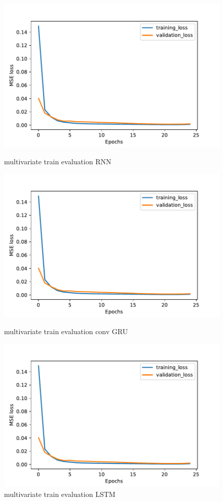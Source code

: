 \documentclass
[twocolumn,
secnumarabic,
nobibnotes,
aps,
prl,
reprint,
groupedaddress,
amsmath,
amssymb,
]{revtex4-2}
\begin{document}
\begin{figure}
  \includegraphics[width=\columnwidth]{figures/multivariate_train_evaluation_RNN.pdf}
  \caption{\label{fig:multivariate_train_evaluation_RNN} multivariate train evaluation RNN}
  \includegraphics[width=\columnwidth]{figures/multivariate_train_evaluation_RNN.pdf}
  \caption{\label{fig:multivariate_train_evaluation_ConvGRU} multivariate train evaluation conv GRU}
  \includegraphics[width=\columnwidth]{figures/multivariate_train_evaluation_RNN.pdf}
  \caption{\label{fig:multivariate_train_evaluation_LSTM} multivariate train evaluation LSTM}
\end{figure}
\end{document}
